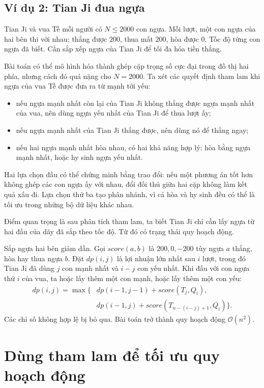 \documentclass[11pt]{article}
\newcommand{\Oh}{\mathcal{O}}
\begin{document}
\subsection{Ví dụ 2: Tian Ji đua ngựa}

Tian Ji và vua Tề mỗi người có \(N\le 2000\) con ngựa. Mỗi lượt, một con ngựa
của hai bên thi với nhau; thắng được \(200\), thua mất \(200\), hòa được
\(0\). Tốc độ từng con ngựa đã biết. Cần sắp xếp ngựa của Tian Ji để tối đa hóa
tiền thắng.

Bài toán có thể mô hình hóa thành ghép cặp trọng số cực đại trong đồ thị hai
phía, nhưng cách đó quá nặng cho \(N=2000\). Ta xét các quyết định tham lam khi
ngựa của vua Tề được đưa ra từ mạnh tới yếu:
\begin{itemize}
  \item nếu ngựa mạnh nhất còn lại của Tian Ji không thắng được ngựa mạnh nhất
  của vua, nên dùng ngựa yếu nhất của Tian Ji để thua lượt ấy;
  \item nếu ngựa mạnh nhất của Tian Ji thắng được, nên dùng nó để thắng ngay;
  \item nếu hai ngựa mạnh nhất hòa nhau, có hai khả năng hợp lý: hòa bằng ngựa
  mạnh nhất, hoặc hy sinh ngựa yếu nhất.
\end{itemize}

Hai lựa chọn đầu có thể chứng minh bằng trao đổi: nếu một phương án tốt hơn
không ghép các con ngựa ấy với nhau, đổi đối thủ giữa hai cặp không làm kết
quả xấu đi. Lựa chọn thứ ba tạo phân nhánh, vì cả hòa và hy sinh đều có thể là
tối ưu trong những bộ dữ liệu khác nhau.

Điểm quan trọng là sau phân tích tham lam, ta biết Tian Ji chỉ cần lấy ngựa từ
hai đầu của dãy đã sắp theo tốc độ. Từ đó có trạng thái quy hoạch động.

Sắp ngựa hai bên giảm dần. Gọi \(score(a,b)\) là \(200,0,-200\) tùy ngựa
\(a\) thắng, hòa hay thua ngựa \(b\). Đặt \(dp(i,j)\) là lợi nhuận lớn nhất sau
\(i\) lượt, trong đó Tian Ji đã dùng \(j\) con mạnh nhất và \(i-j\) con yếu
nhất. Khi đấu với con ngựa thứ \(i\) của vua, ta hoặc lấy thêm một con mạnh,
hoặc lấy thêm một con yếu:
\[
\begin{aligned}
dp(i,j)=\max\{&
dp(i-1,j-1)+score(T_j,Q_i),\\
&dp(i-1,j)+score(T_{n-(i-j)+1},Q_i)\}.
\end{aligned}
\]
Các chỉ số không hợp lệ bị bỏ qua. Bài toán trở thành quy hoạch động
\(\Oh(n^2)\).

\section{Dùng tham lam để tối ưu quy hoạch động}
\end{document}
